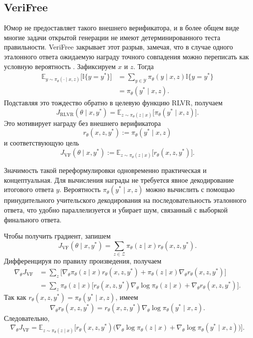 \subsection{VeriFree}

Юмор не предоставляет такого внешнего верификатора, и в более общем виде многие задачи открытой генерации не имеют детерминированного теста правильности. VeriFree закрывает этот разрыв, замечая, что в случае одного эталонного ответа ожидаемую награду точного совпадения можно переписать как условную вероятность \citep{Zhou2025}. Зафиксируем \(x\) и \(z\). Тогда
\begin{align*}
    \mathbb{E}_{y\sim\pi_{\theta}(\cdot\mid x,z)}
    \big[
        \mathbb{I}\{y=y^{*}\}
        \big]
     & =
    \sum_{y\in\mathcal{Y}}
    \pi_{\theta}(y\mid x,z)
    \mathbb{I}\{y=y^{*}\}
    \\
     & =
    \pi_{\theta}(y^{*}\mid x,z).
\end{align*}
Подставляя это тождество обратно в целевую функцию RLVR, получаем
\[
    J_{\mathrm{RLVR}}(\theta\mid x,y^{*})
    =
    \mathbb{E}_{z\sim\pi_{\theta}(z\mid x)}
    \big[
        \pi_{\theta}(y^{*}\mid x,z)
        \big].
\]
Это мотивирует награду без внешнего верификатора
\[
    r_{\theta}(x,z,y^{*})
    :=
    \pi_{\theta}(y^{*}\mid x,z)
\]
и соответствующую цель
\[
    J_{\mathrm{VF}}(\theta\mid x,y^{*})
    :=
    \mathbb{E}_{z\sim\pi_{\theta}(z\mid x)}
    \big[
        r_{\theta}(x,z,y^{*})
        \big].
\]

Значимость такой переформулировки одновременно практическая и концептуальная. Для вычисления награды не требуется явное декодирование итогового ответа \(y\). Вероятность \(\pi_{\theta}(y^{*}\mid x,z)\) можно вычислить с помощью принудительного учительского декодирования на последовательность эталонного ответа, что удобно параллелизуется и убирает шум, связанный с выборкой финального ответа.

Чтобы получить градиент, запишем
\[
    J_{\mathrm{VF}}(\theta\mid x,y^{*})
    =
    \sum_{z\in\mathcal{Z}}
    \pi_{\theta}(z\mid x)
    r_{\theta}(x,z,y^{*}).
\]
Дифференцируя по правилу произведения, получаем
\begin{align*}
    \nabla_{\theta}J_{\mathrm{VF}}
     & =
    \sum_z
    \Big[
        \nabla_{\theta}\pi_{\theta}(z\mid x)
        r_{\theta}(x,z,y^{*})
        +
        \pi_{\theta}(z\mid x)
        \nabla_{\theta}r_{\theta}(x,z,y^{*})
        \Big]
    \\
     & =
    \sum_z
    \pi_{\theta}(z\mid x)
    \Big[
        r_{\theta}(x,z,y^{*})
        \nabla_{\theta}\log\pi_{\theta}(z\mid x)
        +
        \nabla_{\theta}r_{\theta}(x,z,y^{*})
        \Big].
\end{align*}
Так как \(r_{\theta}(x,z,y^{*})=\pi_{\theta}(y^{*}\mid x,z)\), имеем
\[
    \nabla_{\theta}r_{\theta}(x,z,y^{*})
    =
    r_{\theta}(x,z,y^{*})
    \nabla_{\theta}\log\pi_{\theta}(y^{*}\mid x,z).
\]
Следовательно,
\[
    \nabla_{\theta}J_{\mathrm{VF}}
    =
    \mathbb{E}_{z\sim\pi_{\theta}(z\mid x)}
    \Big[
        r_{\theta}(x,z,y^{*})
        \big(
        \nabla_{\theta}\log\pi_{\theta}(z\mid x)
        +
        \nabla_{\theta}\log\pi_{\theta}(y^{*}\mid x,z)
        \big)
        \Big].
\]

